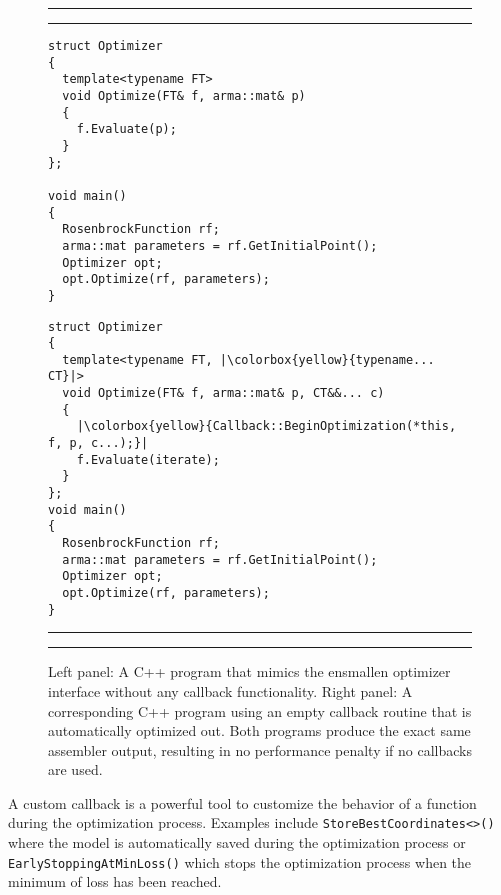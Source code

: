 \begin{figure}[!tb]
\centering
\hrule
\hrule
\vspace{0.5ex}
\begin{minipage}{0.45\textwidth}
\begin{verbatim}
struct Optimizer
{
  template<typename FT>
  void Optimize(FT& f, arma::mat& p)
  {
    f.Evaluate(p);
  }
};

void main()
{
  RosenbrockFunction rf;
  arma::mat parameters = rf.GetInitialPoint();
  Optimizer opt;
  opt.Optimize(rf, parameters);
}

\end{verbatim}
\end{minipage}
%
\hfill
\vline
\vline
\hfill
%
\begin{minipage}{0.45\textwidth}
\begin{verbatim}
struct Optimizer
{
  template<typename FT, |\colorbox{yellow}{typename... CT}|>
  void Optimize(FT& f, arma::mat& p, CT&&... c)
  {
    |\colorbox{yellow}{Callback::BeginOptimization(*this, f, p, c...);}|
    f.Evaluate(iterate);
  }
};
void main()
{
  RosenbrockFunction rf;
  arma::mat parameters = rf.GetInitialPoint();
  Optimizer opt;
  opt.Optimize(rf, parameters);
}
\end{verbatim}
\end{minipage}
\vspace{0.5ex}
\hrule
\hrule
\caption
  {
  Left panel: A C++ program that mimics the ensmallen optimizer interface
  without any callback functionality. Right panel: A corresponding C++ program
  using an empty callback routine that is automatically optimized out. Both
  programs produce the exact same assembler output, resulting in no performance
  penalty if no callbacks are used.
  }
\label{fig:manual_vs_automatic_conversion}
\end{figure}





A custom callback is a powerful tool to customize the behavior of a function
during the optimization process. Examples include {\tt StoreBestCoordinates<>()}
where the model is automatically saved during the optimization process or {\tt
EarlyStoppingAtMinLoss()}  which stops the optimization process when the minimum
of loss has been reached.

